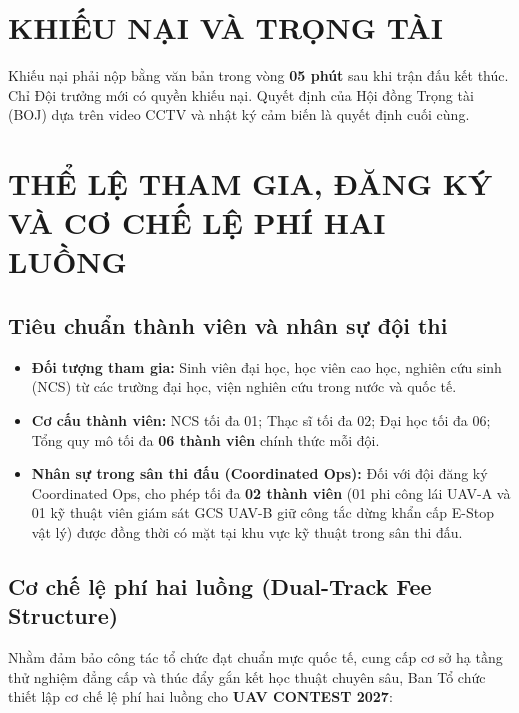 \documentclass[12pt,a4paper]{article}
\begin{document}
\section{KHIẾU NẠI VÀ TRỌNG TÀI}

Khiếu nại phải nộp bằng văn bản trong vòng \textbf{05 phút} sau khi trận đấu kết thúc. Chỉ Đội trưởng mới có quyền khiếu nại. Quyết định của Hội đồng Trọng tài (BOJ) dựa trên video CCTV và nhật ký cảm biến là quyết định cuối cùng.

\section{THỂ LỆ THAM GIA, ĐĂNG KÝ VÀ CƠ CHẾ LỆ PHÍ HAI LUỒNG}

\subsection{Tiêu chuẩn thành viên và nhân sự đội thi}
\begin{itemize}
\item \textbf{Đối tượng tham gia:} Sinh viên đại học, học viên cao học, nghiên cứu sinh (NCS) từ các trường đại học, viện nghiên cứu trong nước và quốc tế.
\item \textbf{Cơ cấu thành viên:} NCS tối đa 01; Thạc sĩ tối đa 02; Đại học tối đa 06; Tổng quy mô tối đa \textbf{06 thành viên} chính thức mỗi đội.
\item \textbf{Nhân sự trong sân thi đấu (Coordinated Ops):} Đối với đội đăng ký Coordinated Ops, cho phép tối đa \textbf{02 thành viên} (01 phi công lái UAV-A và 01 kỹ thuật viên giám sát GCS UAV-B giữ công tắc dừng khẩn cấp E-Stop vật lý) được đồng thời có mặt tại khu vực kỹ thuật trong sân thi đấu.
\end{itemize}

\subsection{Cơ chế lệ phí hai luồng (Dual-Track Fee Structure)}
Nhằm đảm bảo công tác tổ chức đạt chuẩn mực quốc tế, cung cấp cơ sở hạ tầng thử nghiệm đẳng cấp và thúc đẩy gắn kết học thuật chuyên sâu, Ban Tổ chức thiết lập cơ chế lệ phí hai luồng cho \textbf{UAV CONTEST 2027}:
\end{document}
